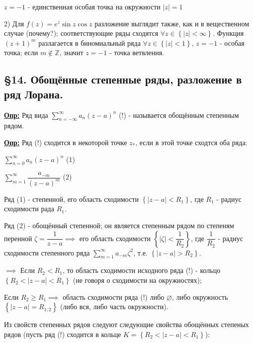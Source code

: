 \documentclass[a4paper, 12pt]{article}
\begin{document}
  \quad $z = -1$ - единственная особая точка на окружности $|z| = 1$

  2) Для $f(z) = e^z \sin z \cos z$ разложение выглядит также, как и в вещественном случае (почему?); соответствующие ряды сходятся $\forall z \in \left\{ |z| < \infty \right\}$. Функция $(z+1)^{m}$ разлагается в биномиальный ряда $\forall z \in \left\{ |z| < 1 \right\}$, $z = -1$ - особая точка; если $m \notin \mathbb{Z}$, значит $z = -1$ - точка ветвления.  

  \begin{center}
    \subsection*{\S14. Обощённые степенные ряды, разложение в ряд Лорана. }
  \end{center}

  \quad \textbf{\underline{Опр:}} Ряд вида $\displaystyle\sum\limits_{n=-\infty}^{\infty} a_n (z-a)^n$ (!) - называется обощённым степенным рядом.

  \quad \textbf{\underline{Опр:}} Ряд (!) сходится в некоторой точке $z_{*}$, если в этой точке сходтся оба ряда:

  \begin{center}
    $\displaystyle\sum\limits_{n=0}^{\infty} a_n (z-a)^n $ (1)

    $\displaystyle\sum\limits_{m=1}^{\infty} \dfrac{a_{-m}}{(z-a)^m}$ (2)
  \end{center}
  
  \quad Ряд (1) - степенной, его область сходимости $\left\{ |z-a| < R_1 \right\}$, где $R_1$ - радиус сходимости рада $R_1$. 

  \quad Ряд (2) - обощённый степенной; он является степенным рядом по степеням перенной $\zeta = \dfrac{1}{z -a} \implies$ его область сходимости $\left\{ |\zeta| < \dfrac{1}{R_2} \right\}$, где $\dfrac{1}{R_2}$ - радиус сходимости степенного ряда $\displaystyle\sum\limits_{m=1}^{\infty} a_{-m} \zeta^2$, т.е. $\left\{ |z-a| > R_2 \right\}$. 

  \quad $\implies$ Если $R_2 < R_1$, то область сходимости исходного ряда (!) - кольцо $\left\{ R_2 < |z-a| < R_1 \right\}$ (не говоря о сходимости на окружностях);

  \quad Если $R_2 \geq R_1 \implies $ область сходимости ряда (!)  либо $\varnothing$, либо окружность $\left\{ |z -a| = R_{1,2} \right\}$ (либо вся, либо часть окружности).

  \quad Из свойств степенных рядов следуют следующие свойства обощённых степеных рядов (пусть ряд (!) сходится в кольце $K = \left\{ R_2 < |z-a| < R_1 \right\} $):
\end{document}
